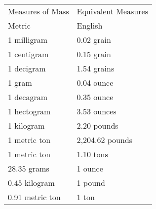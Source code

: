 \begin{table}[!h]
\begin{tabular}{ll}
\hline
 & \\
\hline \hline
Measures of Mass &Equivalent Measures\\
\hline
Metric &English\\
1 milligram &0.02 grain\\
1 centigram &0.15 grain\\
1 decigram &1.54 grains\\
1 gram &0.04 ounce\\
1 decagram &0.35 ounce\\
1 hectogram &3.53 ounces\\
1 kilogram &2.20 pounds\\
1 metric ton &2,204.62 pounds\\
1 metric ton &1.10 tons\\
28.35 grams &1 ounce\\
0.45 kilogram &1 pound\\
0.91 metric ton &1 ton\\
\hline
\end{tabular}
\label{chap3tab:4}
\end{table}

